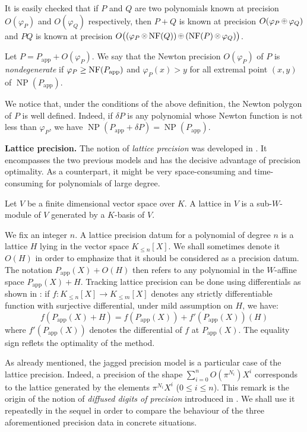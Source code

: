 \documentclass{sig-alternate-05-2015}
\DeclareMathOperator{\NP}{NP}
\newcommand{\NF}{\text{\rm NF}}
\newcommand{\nfop}[1]{%
\raisebox{-0.1mm}{\begin{tikzpicture}
\draw[transparent] (-0.18,0)--(0.18,0);
\draw[very thin] (0,0) circle (0.11cm);
\begin{scope}
\clip (0,0) circle (0.11cm);
\node[scale=0.75] at (0,0) { $#1$ };
\end{scope}
\end{tikzpicture}}}
\newcommand{\nfplus}{\nfop+}
\newcommand{\nftimes}{\nfop\times}
\newcommand{\app}{\textrm{app}}
\begin{document}
It is easily checked that if $P$ and $Q$ are two polynomials known at 
precision $O(\varphi_P)$ and $O(\varphi_Q)$ respectively, then $P+Q$ is 
known at precision $O(\varphi_P \nfplus \varphi_Q)$ and $PQ$ is known at 
precision $O\big((\varphi_P \nftimes \NF(Q)) \nfplus (\NF(P) \nftimes 
\varphi_Q)\big)$.

\begin{deftn}
\label{def:nondeg}
Let $P = P_\app + O(\varphi_P)$. We say that the Newton precision 
$O(\varphi_P)$ of $P$ is \emph{nondegenerate} if $\varphi_P \geq 
\NF(P_\app)$ and $\varphi_P(x) > y$ for all extremal point $(x,y)$ of 
$\NP(P_\app)$.
\end{deftn}

We notice that, under the conditions of the above definition, the
Newton polygon of $P$ is well defined. Indeed, if $\delta P$ is any
polynomial whose Newton function is not less than $\varphi_P$, we
have $\NP(P_\app + \delta P) = \NP(P_\app)$.

\medskip

\noindent
{\bf Lattice precision.}
The notion of \emph{lattice precision} was developed in 
\cite{caruso-roe-vaccon:14a}. It encompasses the two previous models and has
the decisive advantage of precision optimality.
 As a counterpart, it might be very space-consuming and time-consuming 
 for polynomials of large degree.

\begin{deftn}
Let $V$ be a finite dimensional vector space over $K$. A lattice
in $V$ is a sub-$W$-module of $V$ generated by a $K$-basis of
$V$.
\end{deftn}

\noindent
We fix an integer $n$. A lattice precision datum for a polynomial of 
degree $n$ is a lattice $H$ lying in the vector space $K_{\leq n}[X]$. 
We shall sometimes denote it $O(H)$ in order to emphasize that it should 
be considered as a precision datum. The notation $P_\app(X) + O(H)$ then 
refers to any polynomial in the $W$-affine space $P_\app(X) + H$. 
Tracking lattice precision can be done using differentials as shown in
\cite[Lemma~3.4 and Proposition~3.12]{caruso-roe-vaccon:14a}: if $f : K_{\leq n}[X] 
\to K_{\leq m}[X]$ denotes any strictly differentiable function with
surjective differential, under mild assumption on $H$, we have:
$$f(P_\app(X)+H) = f(P_\app(X)) + f'(P_\app(X))(H)$$
where $f'(P_\app(X))$ denotes the differential of $f$ at $P_\app(X)$. 
The equality sign reflets the optimality of the method.

As already mentioned, the jagged precision model is a particular case of 
the lattice precision. Indeed, a precision of the shape $\sum_{i=0}^n 
O(\pi^{N_i}) X^i$ corresponds to the lattice generated by the elements 
$\pi^{N_i} X^i$ ($0 \leq i \leq n$). This remark is the origin of the 
notion of \emph{diffused digits of precision} introduced in 
\cite[Definition~2.3]{caruso-roe-vaccon:15a}. We shall use it repeatedly in the 
sequel in order to compare the behaviour of the three aforementioned 
precision data in concrete situations.
\end{document}
